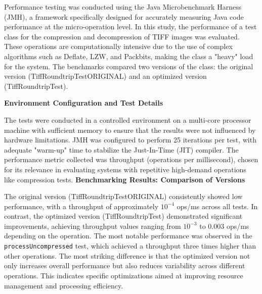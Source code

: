 \documentclass[sigconf]{acmart}
\begin{document}
Performance testing was conducted using the Java Microbenchmark Harness (JMH\cite{jmh}), a framework specifically designed for accurately measuring Java code performance at the micro-operation level. In this study, the performance of a test class for the compression and decompression of TIFF images was evaluated. These operations are computationally intensive due to the use of complex algorithms such as Deflate, LZW, and Packbits, making the class a "heavy" load for the system. The benchmarks compared two versions of the class: the original version (TiffRoundtripTestORIGINAL) and an optimized version (TiffRoundtripTest).

\textbf{Environment Configuration and Test Details}

The tests were conducted in a controlled environment on a multi-core processor machine with sufficient memory to ensure that the results were not influenced by hardware limitations. JMH was configured to perform 25 iterations per test, with adequate "warm-up" time to stabilize the Just-In-Time (JIT) compiler. The performance metric collected was throughput (operations per millisecond), chosen for its relevance in evaluating systems with repetitive high-demand operations like compression tests.
\newpage
\textbf{Benchmarking Results: Comparison of Versions}

The original version (TiffRoundtripTestORIGINAL) consistently showed low performance,
with a throughput of approximately \(10^{-4}\) ops/ms across all tests. In contrast, the optimized version (TiffRoundtripTest) demonstrated significant improvements, achieving throughput values ranging from \(10^{-3}\) to \(0.003\) ops/ms depending on the operation. The most notable performance was observed in the \texttt{processUncompressed} test, which achieved a throughput three times higher than other operations.
The most striking difference is that the optimized version not only increases overall performance but also reduces variability across different operations. This indicates specific optimizations aimed at improving resource management and processing efficiency.
\end{document}

